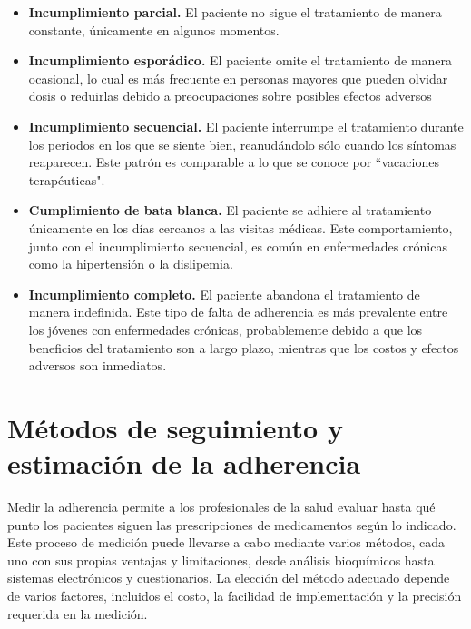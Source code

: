 \begin{itemize}
	\item \textbf{Incumplimiento parcial.} El paciente no sigue el tratamiento de manera constante, únicamente en algunos momentos.

	\item \textbf{Incumplimiento esporádico.} El paciente omite el tratamiento de manera ocasional, lo cual es más frecuente en personas mayores que pueden olvidar dosis o reduirlas debido a preocupaciones sobre posibles efectos adversos
	
	\item \textbf{Incumplimiento secuencial.} El paciente interrumpe el tratamiento durante los periodos en los que se siente bien, reanudándolo sólo cuando los síntomas reaparecen. Este patrón es comparable a lo que se conoce por ``vacaciones terapéuticas".
	
	\item \textbf{Cumplimiento de bata blanca.} El paciente se adhiere al tratamiento únicamente en los días cercanos a las visitas médicas. Este comportamiento, junto con el incumplimiento secuencial, es común en enfermedades crónicas como la hipertensión o la dislipemia.
	
	\item \textbf{Incumplimiento completo.} El paciente abandona el tratamiento de manera indefinida. Este tipo de falta de adherencia es más prevalente entre los jóvenes con enfermedades crónicas, probablemente debido a que los beneficios del tratamiento son a largo plazo, mientras que los costos y efectos adversos son inmediatos.
	
\end{itemize}

\section{Métodos de seguimiento y estimación de la adherencia}

Medir la adherencia permite a los profesionales de la salud evaluar hasta qué punto los pacientes siguen las prescripciones de medicamentos según lo indicado. Este proceso de medición puede llevarse a cabo mediante varios métodos, cada uno con sus propias ventajas y limitaciones, desde análisis bioquímicos hasta sistemas electrónicos y cuestionarios. La elección del método adecuado depende de varios factores, incluidos el costo, la facilidad de implementación y la precisión requerida en la medición. \\

